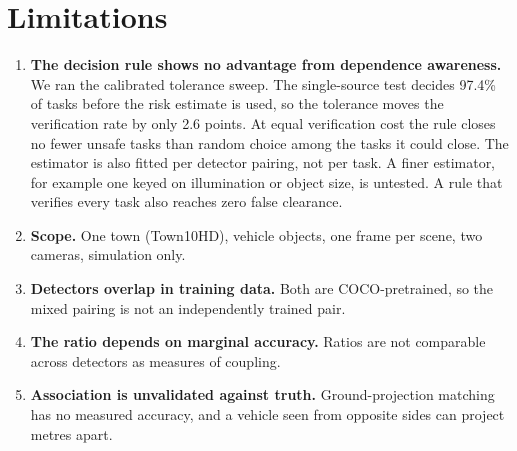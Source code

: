 \section{Limitations}
\label{sec:limits}

\begin{enumerate}
  \item \textbf{The decision rule shows no advantage from dependence
        awareness.} We ran the calibrated tolerance sweep. The single-source
        test decides 97.4\% of tasks before the risk estimate is used, so the
        tolerance moves the verification rate by only 2.6 points. At equal
        verification cost the rule closes no fewer unsafe tasks than random
        choice among the tasks it could close. The estimator is also fitted
        per detector pairing, not per task. A finer estimator, for example
        one keyed on illumination or object size, is untested. A rule that
        verifies every task also reaches zero false clearance.
  \item \textbf{Scope.} One town (Town10HD), vehicle objects, one frame per
        scene, two cameras, simulation only.
  \item \textbf{Detectors overlap in training data.} Both are COCO-pretrained,
        so the mixed pairing is not an independently trained pair.
  \item \textbf{The ratio depends on marginal accuracy.} Ratios are not
        comparable across detectors as measures of coupling.
  \item \textbf{Association is unvalidated against truth.} Ground-projection
        matching has no measured accuracy, and a vehicle seen from opposite
        sides can project metres apart.
\end{enumerate}
